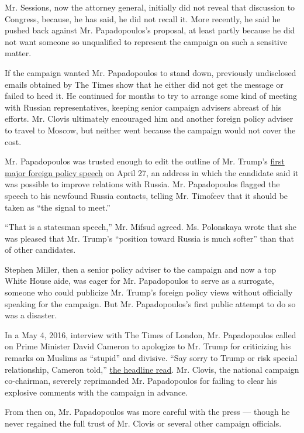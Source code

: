 Mr. Sessions, now the attorney general, initially did not reveal that
discussion to Congress, because, he has said, he did not recall it. More
recently, he said he pushed back against Mr. Papadopoulos's proposal, at
least partly because he did not want someone so unqualified to represent
the campaign on such a sensitive matter.

If the campaign wanted Mr. Papadopoulos to stand down, previously
undisclosed emails obtained by The Times show that he either did not get
the message or failed to heed it. He continued for months to try to
arrange some kind of meeting with Russian representatives, keeping
senior campaign advisers abreast of his efforts. Mr. Clovis ultimately
encouraged him and another foreign policy adviser to travel to Moscow,
but neither went because the campaign would not cover the cost.

Mr. Papadopoulos was trusted enough to edit the outline of Mr. Trump's
\href{https://www.nytimes3xbfgragh.onion/2016/04/28/us/politics/donald-trump-foreign-policy-speech.html}{first
major foreign policy speech} on April 27, an address in which the
candidate said it was possible to improve relations with Russia. Mr.
Papadopoulos flagged the speech to his newfound Russia contacts, telling
Mr. Timofeev that it should be taken as ``the signal to meet.''

``That is a statesman speech,'' Mr. Mifsud agreed. Ms. Polonskaya wrote
that she was pleased that Mr. Trump's ``position toward Russia is much
softer'' than that of other candidates.

Stephen Miller, then a senior policy adviser to the campaign and now a
top White House aide, was eager for Mr. Papadopoulos to serve as a
surrogate, someone who could publicize Mr. Trump's foreign policy views
without officially speaking for the campaign. But Mr. Papadopoulos's
first public attempt to do so was a disaster.

In a May 4, 2016, interview with The Times of London, Mr. Papadopoulos
called on Prime Minister David Cameron to apologize to Mr. Trump for
criticizing his remarks on Muslims as ``stupid'' and divisive. ``Say
sorry to Trump or risk special relationship, Cameron told,''
\href{https://www.thetimes.co.uk/article/say-sorry-to-trump-or-risk-special-relationship-cameron-told-h6ng0r7xj}{the
headline read}. Mr. Clovis, the national campaign co-chairman, severely
reprimanded Mr. Papadopoulos for failing to clear his explosive comments
with the campaign in advance.

From then on, Mr. Papadopoulos was more careful with the press ---
though he never regained the full trust of Mr. Clovis or several other
campaign officials.

